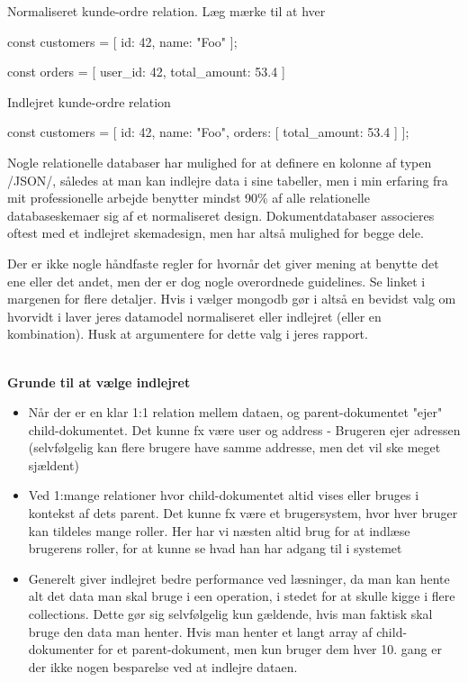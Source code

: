 \documentclass[english,course]{lecture}
\begin{document}
\begin{listing}[H]
\caption{Normaliseret kunde-ordre relation. Læg mærke til at hver }
\label{lst:normalized}
\begin{jscode}
const customers = [{
	id: 42,
	name: "Foo"
}];

const orders = [{
	user_id: 42,
	total_amount: 53.4
}]
\end{jscode}
\end{listing}

\begin{listing}[H]
\caption{Indlejret kunde-ordre relation}
\label{lst:embedded}
\begin{jscode}
const customers = [{
	id: 42,
	name: "Foo",
	orders: [{
		total_amount: 53.4
	}]
}];
\end{jscode}
\end{listing}

Nogle relationelle databaser har mulighed for at definere en kolonne af typen \sqlinline/JSON/, således at man kan indlejre data i sine tabeller, men i min erfaring fra mit professionelle arbejde benytter mindst 90\% af alle relationelle databaseskemaer sig af et normaliseret design. Dokumentdatabaser associeres oftest med et indlejret skemadesign, men har altså mulighed for begge dele.

Der er ikke nogle håndfaste regler for hvornår det giver mening at benytte det ene eller det andet, men der er dog nogle overordnede guidelines. Se linket i margenen for flere detaljer. Hvis i vælger mongodb gør i altså en bevidst valg om hvorvidt i laver jeres datamodel normaliseret eller indlejret (eller en kombination). Husk at argumentere for dette valg i jeres rapport. 

\\\textbf{Grunde til at vælge indlejret}

\begin{itemize}
	\item Når der er en klar 1:1 relation mellem dataen, og parent-dokumentet "ejer" child-dokumentet. Det kunne fx være user og address - Brugeren ejer adressen (selvfølgelig kan flere brugere have samme addresse, men det vil ske meget sjældent)
	\item Ved 1:mange relationer hvor child-dokumentet altid vises eller bruges i kontekst af dets parent. Det kunne fx være et brugersystem, hvor hver bruger kan tildeles mange roller. Her har vi næsten altid brug for at indlæse brugerens roller, for at kunne se hvad han har adgang til i systemet
	\item Generelt giver indlejret bedre performance ved læsninger, da man kan hente alt det data man skal bruge i een operation, i stedet for at skulle kigge i flere collections. Dette gør sig selvfølgelig kun gældende, hvis man faktisk skal bruge den data man henter. Hvis man henter et langt array af child-dokumenter for et parent-dokument, men kun bruger dem hver 10. gang er der ikke nogen besparelse ved at indlejre dataen.
\end{itemize}
\end{document}
